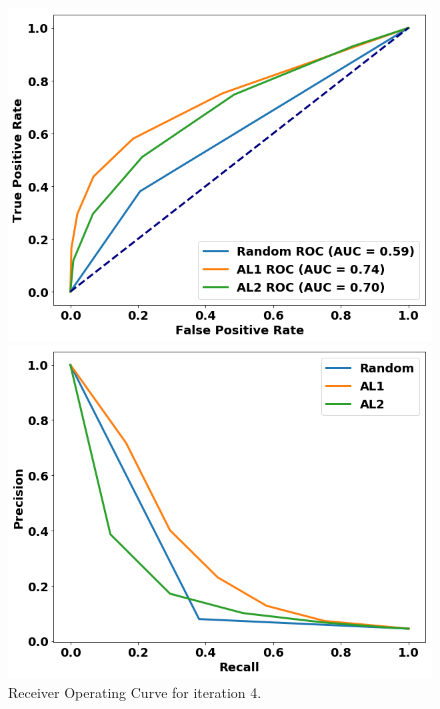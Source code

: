 \begin{figure}

\centering
\begin{minipage}[b]{.4\textwidth}
\includegraphics[trim=0in 0.1in 0.1in 0.in,clip,width=1.0\textwidth]{figures/rocs_round5.png}
\captionsetup{labelformat=empty}
\caption{Receiver Operating Curve for iteration 4.}\label{fig:rocs_round5}
\end{minipage}\qquad
\begin{minipage}[b]{.4\textwidth}
\includegraphics[trim=0in 0.1in 0.1in 0.in,clip,width=1.0\textwidth]{figures/prcs_round5.png}

\end{minipage}
\end{figure}
